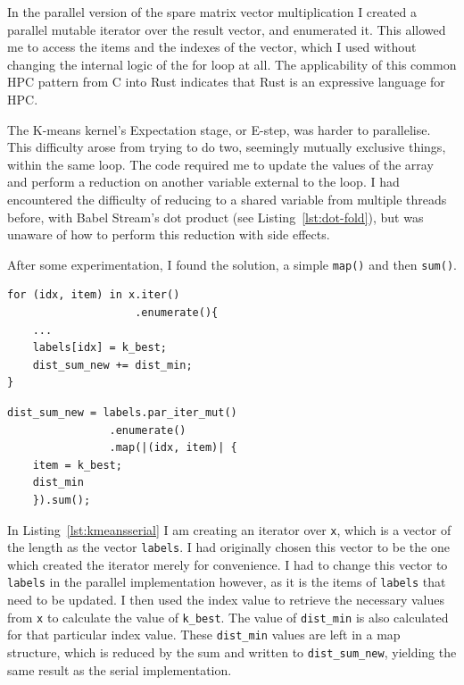 In the parallel version of the spare matrix vector multiplication I created a parallel mutable iterator over the result vector, and enumerated it. This allowed me to access the items and the indexes of the vector, which I used without changing the internal logic of the for loop at all. The applicability of this common HPC pattern from C into Rust indicates that Rust is an expressive language for HPC.

The K-means kernel's Expectation stage, or E-step, was harder to parallelise. This difficulty arose from trying to do two, seemingly mutually exclusive things, within the same loop. The code required me to update the values of the array and perform a reduction on another variable external to the loop. I had encountered the difficulty of reducing to a shared variable from multiple threads before, with Babel Stream's dot product (see Listing~\ref{lst:dot-fold}), but was unaware of how to perform this reduction with side effects.

After some experimentation, I found the solution, a simple \texttt{map()} and then \texttt{sum()}. 

\begin{minipage}{.48\textwidth}
\begin{code}
\begin{verbatim}
for (idx, item) in x.iter()
                    .enumerate(){
    ...
    labels[idx] = k_best;
    dist_sum_new += dist_min;
}
\end{verbatim}
\label{lst:kmeansserial}
\end{code}
\end{minipage}\hfill
\begin{minipage}{.48\textwidth}
\begin{code}
\begin{verbatim}
dist_sum_new = labels.par_iter_mut()
                .enumerate()
                .map(|(idx, item)| {
    item = k_best;
    dist_min
    }).sum();
\end{verbatim}
\label{lst:kmeanspar}
\end{code}
\end{minipage}

In Listing~\ref{lst:kmeansserial} I am creating an iterator over \texttt{x}, which is a vector of the length as the vector \texttt{labels}. I had originally chosen this vector to be the one which created the iterator merely for convenience. I had to change this vector to \texttt{labels} in the parallel implementation however, as it is the items of \texttt{labels} that need to be updated. I then used the index value to retrieve the necessary values from \texttt{x} to calculate the value of \texttt{k\_best}. The value of \texttt{dist\_min} is also calculated for that particular index value. These \texttt{dist\_min} values are left in a map structure, which is reduced by the sum and written to \texttt{dist\_sum\_new}, yielding the same result as the serial implementation. 


